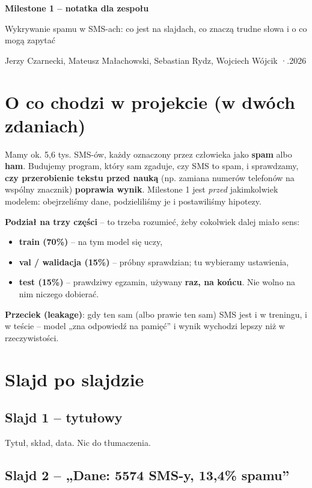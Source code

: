 \documentclass[11pt,a4paper]{article}
\begin{document}
{\LARGE\bfseries Milestone 1 -- notatka dla zespołu\par}
\vspace{2pt}
{\large Wykrywanie spamu w SMS-ach: co jest na slajdach, co znaczą trudne słowa i o co mogą zapytać\par}
\vspace{4pt}
{\small Jerzy Czarnecki, Mateusz Małachowski, Sebastian Rydz, Wojciech Wójcik \quad·.2026}

\section{O co chodzi w projekcie (w dwóch zdaniach)}

Mamy ok. 5,6 tys. SMS-ów, każdy oznaczony przez człowieka jako \textbf{spam} albo \textbf{ham}. Budujemy program, który
sam zgaduje, czy SMS to spam, i sprawdzamy, \textbf{czy przerobienie tekstu przed nauką} (np. zamiana numerów telefonów na
wspólny znacznik) \textbf{poprawia wynik}. Milestone 1 jest \emph{przed} jakimkolwiek modelem: obejrzeliśmy dane,
podzieliliśmy je i postawiliśmy hipotezy.

\textbf{Podział na trzy części} -- to trzeba rozumieć, żeby cokolwiek dalej miało sens:
\begin{itemize}
  \item \textbf{train (70\%)} -- na tym model się uczy,
  \item \textbf{val / walidacja (15\%)} -- próbny sprawdzian; tu wybieramy ustawienia,
  \item \textbf{test (15\%)} -- prawdziwy egzamin, używany \textbf{raz, na końcu}. Nie wolno na nim niczego dobierać.
\end{itemize}
\textbf{Przeciek (leakage)}: gdy ten sam (albo prawie ten sam) SMS jest i w treningu, i w teście -- model „zna odpowiedź
na pamięć” i wynik wychodzi lepszy niż w rzeczywistości.

\section{Slajd po slajdzie}

\subsection{Slajd 1 -- tytułowy}
Tytuł, skład, data. Nic do tłumaczenia.

\subsection{Slajd 2 -- „Dane: 5574 SMS-y, 13,4\% spamu”}
\end{document}

